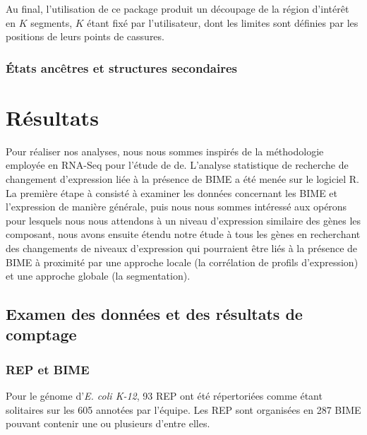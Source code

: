 \documentclass[12pt,a4paper]{report}
\begin{document}
\begin{onehalfspace}
Au final, l'utilisation de ce package produit un découpage de la région d'intérêt en $K$ segments, $K$ étant fixé par l'utilisateur, dont les limites sont définies par les positions de leurs points de cassures.

\subsection*{États ancêtres et structures secondaires}

\chapter*{Résultats}

Pour réaliser nos analyses, nous nous sommes inspirés de la méthodologie employée en RNA-Seq pour l'étude de \gls{de}. L'analyse statistique de recherche de changement d'expression liée à la présence de BIME a été menée sur le logiciel R. La première étape à consisté à examiner les données concernant les BIME et l'expression de manière générale, puis nous nous sommes intéressé aux opérons pour lesquels nous nous attendons à un niveau d'expression similaire des gènes les composant, nous avons ensuite étendu notre étude à tous les gènes en recherchant des changements de niveaux d'expression qui pourraient être liés à la présence de BIME à proximité par une approche locale (la corrélation de profils d'expression) et une approche globale (la segmentation). 

\section*{Examen des données et des résultats de comptage}

\subsection*{REP et BIME}
Pour le génome d'\textit{E. coli K-12}, 93 REP ont été répertoriées comme étant solitaires sur les 605 annotées par l'équipe. Les REP sont organisées en 287 BIME pouvant contenir une ou plusieurs d'entre elles. 


\end{onehalfspace}
\end{document}
